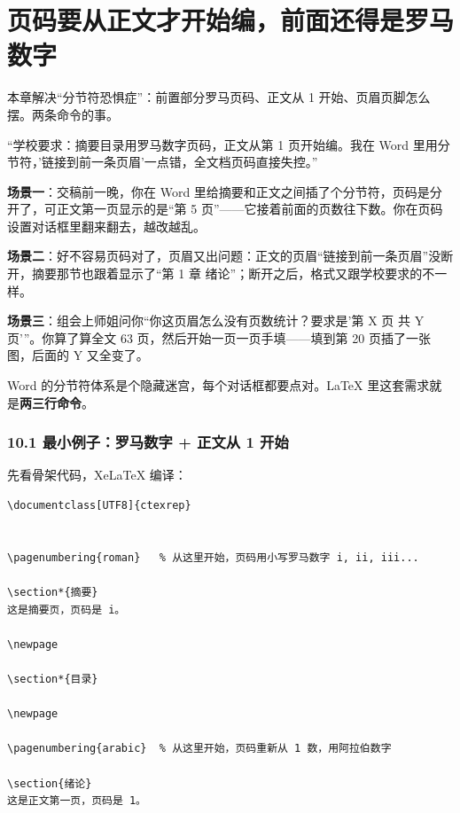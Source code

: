 \chapter{页码要从正文才开始编，前面还得是罗马数字}

\begin{notebox}
本章解决“分节符恐惧症”：前置部分罗马页码、正文从 1 开始、页眉页脚怎么摆。两条命令的事。
\end{notebox}


“学校要求：摘要目录用罗马数字页码，正文从第 1 页开始编。我在 Word 里用分节符，'链接到前一条页眉'一点错，全文档页码直接失控。”


\textbf{场景一}：交稿前一晚，你在 Word 里给摘要和正文之间插了个分节符，页码是分开了，可正文第一页显示的是“第 5 页”——它接着前面的页数往下数。你在页码设置对话框里翻来翻去，越改越乱。

\textbf{场景二}：好不容易页码对了，页眉又出问题：正文的页眉“链接到前一条页眉”没断开，摘要那节也跟着显示了“第 1 章 绪论”；断开之后，格式又跟学校要求的不一样。

\textbf{场景三}：组会上师姐问你“你这页眉怎么没有页数统计？要求是'第 X 页 共 Y 页'”。你算了算全文 63 页，然后开始一页一页手填——填到第 20 页插了一张图，后面的 Y 又全变了。

Word 的分节符体系是个隐藏迷宫，每个对话框都要点对。LaTeX 里这套需求就是\textbf{两三行命令}。


\subsection*{10.1 最小例子：罗马数字 + 正文从 1 开始}

先看骨架代码，XeLaTeX 编译：

\begin{lstlisting}
\documentclass[UTF8]{ctexrep}


\pagenumbering{roman}   % 从这里开始，页码用小写罗马数字 i, ii, iii...

\section*{摘要}
这是摘要页，页码是 i。

\newpage

\section*{目录}

\newpage

\pagenumbering{arabic}  % 从这里开始，页码重新从 1 数，用阿拉伯数字

\section{绪论}
这是正文第一页，页码是 1。


\end{lstlisting}

